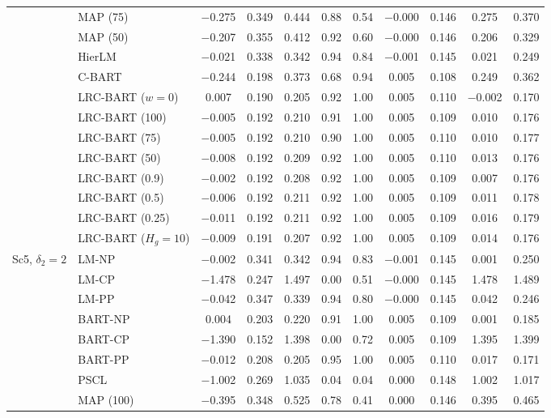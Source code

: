 \begin{center}
\begin{longtable}{llccccccccc}
& MAP (75) & $-$0.275 & 0.349 & 0.444 & 0.88 & 0.54 & $-$0.000 & 0.146 & 0.275 & 0.370 \\
& MAP (50) & $-$0.207 & 0.355 & 0.412 & 0.92 & 0.60 & $-$0.000 & 0.146 & 0.206 & 0.329 \\
& HierLM & $-$0.021 & 0.338 & 0.342 & 0.94 & 0.84 & $-$0.001 & 0.145 & 0.021 & 0.249 \\
& C-BART & $-$0.244 & 0.198 & 0.373 & 0.68 & 0.94 & 0.005 & 0.108 & 0.249 & 0.362 \\
& LRC-BART ($w=0$) & 0.007 & 0.190 & 0.205 & 0.92 & 1.00 & 0.005 & 0.110 & $-$0.002 & 0.170 \\
& LRC-BART (100) & $-$0.005 & 0.192 & 0.210 & 0.91 & 1.00 & 0.005 & 0.109 & 0.010 & 0.176 \\
& LRC-BART (75) & $-$0.005 & 0.192 & 0.210 & 0.90 & 1.00 & 0.005 & 0.110 & 0.010 & 0.177 \\
& LRC-BART (50) & $-$0.008 & 0.192 & 0.209 & 0.92 & 1.00 & 0.005 & 0.110 & 0.013 & 0.176 \\
& LRC-BART (0.9) & $-$0.002 & 0.192 & 0.208 & 0.92 & 1.00 & 0.005 & 0.109 & 0.007 & 0.176 \\
& LRC-BART (0.5) & $-$0.006 & 0.192 & 0.211 & 0.92 & 1.00 & 0.005 & 0.109 & 0.011 & 0.178 \\
& LRC-BART (0.25) & $-$0.011 & 0.192 & 0.211 & 0.92 & 1.00 & 0.005 & 0.109 & 0.016 & 0.179 \\
& LRC-BART ($H_g=10$) & $-$0.009 & 0.191 & 0.207 & 0.92 & 1.00 & 0.005 & 0.109 & 0.014 & 0.176 \\
\midrule
\multirow{20}{*}{Sc5, $\delta_2=2$} & LM-NP & $-$0.002 & 0.341 & 0.342 & 0.94 & 0.83 & $-$0.001 & 0.145 & 0.001 & 0.250 \\
& LM-CP & $-$1.478 & 0.247 & 1.497 & 0.00 & 0.51 & $-$0.000 & 0.145 & 1.478 & 1.489 \\
& LM-PP & $-$0.042 & 0.347 & 0.339 & 0.94 & 0.80 & $-$0.000 & 0.145 & 0.042 & 0.246 \\
& BART-NP & 0.004 & 0.203 & 0.220 & 0.91 & 1.00 & 0.005 & 0.109 & 0.001 & 0.185 \\
& BART-CP & $-$1.390 & 0.152 & 1.398 & 0.00 & 0.72 & 0.005 & 0.109 & 1.395 & 1.399 \\
& BART-PP & $-$0.012 & 0.208 & 0.205 & 0.95 & 1.00 & 0.005 & 0.110 & 0.017 & 0.171 \\
& PSCL & $-$1.002 & 0.269 & 1.035 & 0.04 & 0.04 & 0.000 & 0.148 & 1.002 & 1.017 \\
& MAP (100) & $-$0.395 & 0.348 & 0.525 & 0.78 & 0.41 & 0.000 & 0.146 & 0.395 & 0.465 \\

\end{longtable}
\end{center}
